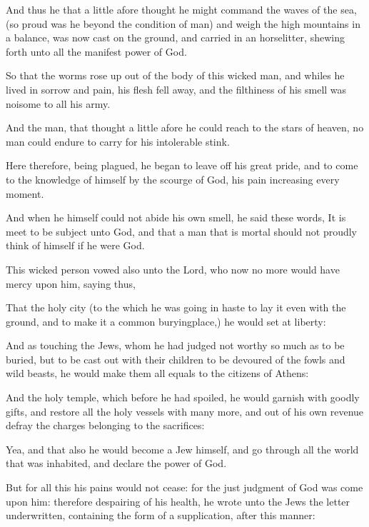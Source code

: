 {\par }{\PP {}And thus he that a little afore thought he might command the waves of the sea, (so proud was he beyond the condition of man) and weigh the high mountains in a balance, was now cast on the ground, and carried in an horselitter, shewing forth unto all the manifest power of God.
\par }{\PP {}So that the worms rose up out of the body of this wicked man, and whiles he lived in sorrow and pain, his flesh fell away, and the filthiness of his smell was noisome to all his army.
\par }{\PP {}And the man, that thought a little afore he could reach to the stars of heaven, no man could endure to carry for his intolerable stink.
\par }{\PP {}Here therefore, being plagued, he began to leave off his great pride, and to come to the knowledge of himself by the scourge of God, his pain increasing every moment.
\par }{\PP {}And when he himself could not abide his own smell, he said these words, It is meet to be subject unto God, and that a man that is mortal should not proudly think of himself if he were God.
\par }{\PP {}This wicked person vowed also unto the Lord, who now no more would have mercy upon him, saying thus,
\par }{\PP {}That the holy city (to the which he was going in haste to lay it even with the ground, and to make it a common buryingplace,) he would set at liberty:
\par }{\PP {}And as touching the Jews, whom he had judged not worthy so much as to be buried, but to be cast out with their children to be devoured of the fowls and wild beasts, he would make them all equals to the citizens of Athens:
\par }{\PP {}And the holy temple, which before he had spoiled, he would garnish with goodly gifts, and restore all the holy vessels with many more, and out of his own revenue defray the charges belonging to the sacrifices:
\par }{\PP {}Yea, and that also he would become a Jew himself, and go through all the world that was inhabited, and declare the power of God.
\par }{\PP {}But for all this his pains would not cease: for the just judgment of God was come upon him: therefore despairing of his health, he wrote unto the Jews the letter underwritten, containing the form of a supplication, after this manner:
}
